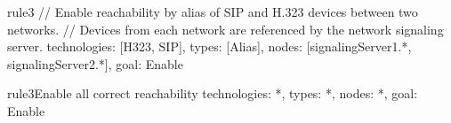 \begin{EntityExample}{}{rule3}{}
// Enable reachability by alias of SIP and H.323 devices between two networks.
// Devices from each network are referenced by the network signaling server.
technologies: [H323, SIP],
types: [Alias],
nodes: [signalingServer1.*, signalingServer2.*],
goal: Enable
\end{EntityExample}

\begin{EntityExample}{}{rule3}{Enable all correct reachability}
technologies: *,
types: *,
nodes: *,
goal: Enable
\end{EntityExample}


      





